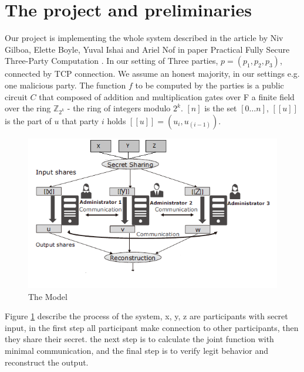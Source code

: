 \documentclass[12pt]{article}
\begin{document}
\pagebreak
\section{The project and preliminaries}
Our project is implementing the whole system described in the article by Niv Gilboa, Elette Boyle, Yuval Ishai and Ariel Nof in paper Practical Fully Secure Three-Party Computation \cite{main}.\hfill\break
In our setting of Three parties, $p = (p_1,p_2,p_3)$, connected by TCP connection. We assume an honest majority, in our settings e.g. one malicious party. The function $f$ to be computed by the parties is a public circuit $C$ that composed of addition and multiplication gates over F a finite field over the ring $\mathbb{Z}_{2^k}$ - the ring of integers modulo $2^k$.  $[n]$ is the set $[0 \ldots n]$, $[[u]]$ is the part of $u$  that party $i$ holds $[[u]] = (u_i, u_{(i-1)}).$
\hfill\break\hfill\break\hfill\break

\begin{figure}[h!]
	\centering
	\includegraphics[width=0.7\linewidth]{"../Figures/fig1"}
	\caption{The Model}
	\label{fig:fig1}
\end{figure}

Figure \ref{fig:fig1} describe the process of the system, x, y, z are participants with secret input, in the first step all participant make connection to other participants, then they share their secret.
the next step is to calculate the joint function with minimal communication, and the final step is to verify legit behavior and reconstruct the output.
\end{document}
